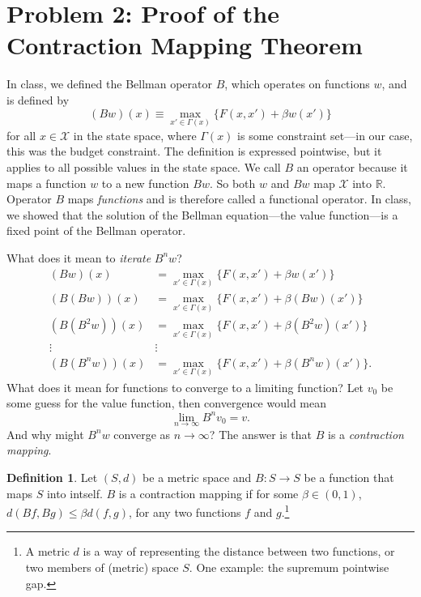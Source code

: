\documentclass[11pt]{extarticle}
\theoremstyle{plain}
\theoremstyle{definition}
\newtheorem{defn}[thm]{Definition}
\begin{document}
\vspace{5mm}
\section*{Problem 2: Proof of the Contraction Mapping Theorem}

In class, we defined the Bellman operator $B$, which operates on functions $w$, and is defined by
\begin{equation*}
	(Bw)(x) \equiv \max_{x' \in \Gamma(x)} \bigg\{ F(x, x') + \beta w(x') \bigg\}
\end{equation*}
for all $x \in \mathcal X$ in the state space, where $\Gamma(x)$ is some constraint set---in our case, this was the budget constraint. The definition is expressed pointwise, but it applies to all possible values in the state space. We call $B$ an operator because it maps a function $w$ to a new function $Bw$. So both $w$ and $Bw$ map $\mathcal X$ into $\mathbb R$. Operator $B$ maps \textit{functions} and is therefore called a functional operator. In class, we showed that the solution of the Bellman equation---the value function---is a fixed point of the Bellman operator.

What does it mean to \textit{iterate} $B^n w$?
\begin{align*}
	(Bw) (x) &= \max_{x' \in \Gamma(x)} \bigg\{ F(x, x') + \beta w(x') \bigg\} \\
	(B(Bw)) (x) &= \max_{x' \in \Gamma(x)} \bigg\{ F(x, x') + \beta (Bw)(x') \bigg\} \\
	(B(B^2w)) (x) &= \max_{x' \in \Gamma(x)} \bigg\{ F(x, x') + \beta (B^2w)(x') \bigg\} \\
	\vdots & \vdots  \\
	(B(B^nw)) (x) &= \max_{x' \in \Gamma(x)} \bigg\{ F(x, x') + \beta (B^nw)(x') \bigg\}.
\end{align*}
What does it mean for functions to converge to a limiting function? Let $v_0$ be some guess for the value function, then convergence would mean
\begin{equation*}
	\lim_{n \to \infty} B^n v_0 = v.
\end{equation*}
And why might $B^n w$ converge as $n \to \infty$? The answer is that $B$ is a \textit{contraction mapping}.


\vspace{5mm}
\begin{defn}
	
	Let $(S, d)$ be a metric space and $B: S \to S$ be a function that maps $S$ into intself. $B$ is a contraction mapping if for some $\beta \in (0, 1)$, $d(Bf, Bg) \leq \beta d(f, g)$, for any two functions $f$ and $g$.\footnote{
		A metric $d$ is a way of representing the distance between two functions, or two members of (metric) space $S$. One example: the supremum pointwise gap.
	}
	
\end{defn}
\end{document}
